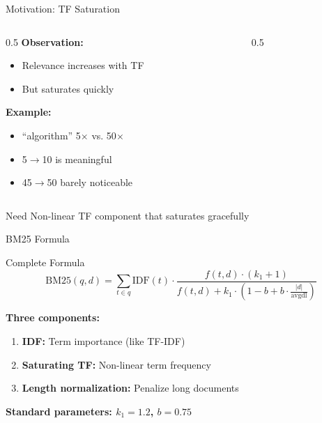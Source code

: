 \documentclass[aspectratio=169]{beamer}
\newif\ifanimated
\newcommand{\cpause}{\ifanimated\pause\fi}
\begin{document}
\begin{frame}[plain]
\sectionpage
\end{frame}

\begin{frame}{Motivation: TF Saturation}
\begin{columns}
\begin{column}{0.5\textwidth}
\textbf{Observation:}
\begin{itemize}
    \item Relevance increases with TF
    \item But saturates quickly
\end{itemize}\cpause

\vspace{1em}

\textbf{Example:}
\begin{itemize}
    \item ``algorithm'' 5$\times$ vs. 50$\times$ 
    \item 5$\rightarrow$10 is meaningful
    \item 45$\rightarrow$50 barely noticeable
\end{itemize}\cpause
\end{column}

\begin{column}{0.5\textwidth}

\end{column}
\end{columns}

\vspace{1em}

\begin{alertblock}{Need}
Non-linear TF component that saturates gracefully
\end{alertblock}
\end{frame}

\begin{frame}{BM25 Formula}
\begin{block}{Complete Formula}
$$\text{BM25}(q,d) = \sum_{t \in q} \text{IDF}(t) \cdot \frac{f(t,d) \cdot (k_1+1)}{f(t,d) + k_1 \cdot \left(1-b+b \cdot \frac{|d|}{\text{avgdl}}\right)}$$
\end{block}

\vspace{1em}

\textbf{Three components:}
\begin{enumerate}
    \item \textbf{IDF:} Term importance (like TF-IDF)
    \item \textbf{Saturating TF:} Non-linear term frequency
    \item \textbf{Length normalization:} Penalize long documents
\end{enumerate}

\vspace{1em}

\begin{center}
\textbf{Standard parameters: $k_1 = 1.2$, $b = 0.75$}
\end{center}
\end{frame}
\end{document}
